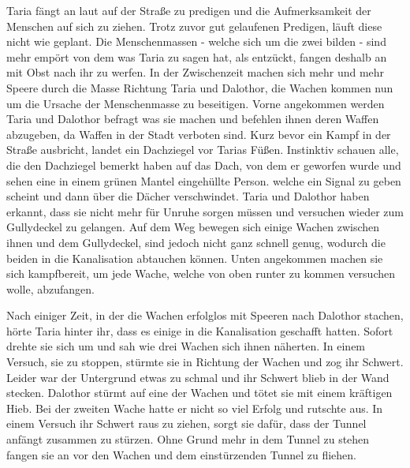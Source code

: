 \documentclass[10pt,twoside,twocolumn,openany]{book}
\begin{document}
	Taria fängt an laut auf der Straße zu predigen und die Aufmerksamkeit der Menschen auf sich zu ziehen. Trotz zuvor gut gelaufenen Predigen, läuft diese nicht wie geplant. Die Menschenmassen - welche sich um die zwei bilden - sind mehr empört von dem was Taria zu sagen hat, als entzückt, fangen deshalb an mit Obst nach ihr zu werfen. In der Zwischenzeit machen sich mehr und mehr Speere durch die Masse Richtung Taria und Dalothor, die Wachen kommen nun um die Ursache der Menschenmasse zu beseitigen. Vorne angekommen werden Taria und Dalothor befragt was sie machen und befehlen ihnen deren Waffen abzugeben, da Waffen in der Stadt verboten sind. Kurz bevor ein Kampf in der Straße ausbricht, landet ein Dachziegel vor Tarias Füßen. Instinktiv schauen alle, die den Dachziegel bemerkt haben auf das Dach, von dem er geworfen wurde und sehen eine in einem grünen Mantel eingehüllte Person. welche ein Signal zu geben scheint und dann über die Dächer verschwindet. Taria und Dalothor haben erkannt, dass sie nicht mehr für Unruhe sorgen müssen und versuchen wieder zum Gullydeckel zu gelangen. Auf dem Weg bewegen sich einige Wachen zwischen ihnen und dem Gullydeckel, sind jedoch nicht ganz schnell genug, wodurch die beiden in die Kanalisation abtauchen können. Unten angekommen machen sie sich kampfbereit, um jede Wache, welche von oben runter zu kommen versuchen wolle, abzufangen. 

	Nach einiger Zeit, in der die Wachen erfolglos mit Speeren nach Dalothor stachen, hörte Taria hinter ihr, dass es einige in die Kanalisation geschafft hatten. Sofort drehte sie sich um und sah wie drei Wachen sich ihnen näherten. In einem Versuch, sie zu stoppen, stürmte sie in Richtung der Wachen und zog ihr Schwert. Leider war der Untergrund etwas zu schmal und ihr Schwert blieb in der Wand stecken. Dalothor stürmt auf eine der Wachen und tötet sie mit einem kräftigen Hieb. Bei der zweiten Wache hatte er nicht so viel Erfolg und rutschte aus. In einem Versuch ihr Schwert raus zu ziehen, sorgt sie dafür, dass der Tunnel anfängt zusammen zu stürzen. Ohne Grund mehr in dem Tunnel zu stehen fangen sie an vor den Wachen und dem einstürzenden Tunnel zu fliehen. 
\end{document}
